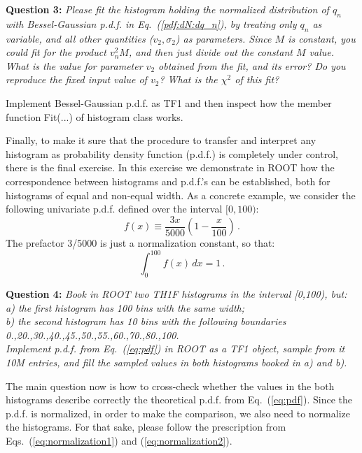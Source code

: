 \documentclass[11pt]{article}
\begin{document}
\bigskip
	
\noindent\textbf{Question 3:} {\it Please fit the histogram holding the normalized distribution of $q_n$ with Bessel-Gaussian p.d.f. in Eq.~(\ref{pdf:dN:dq_n}), by treating only $q_n$ as variable, and all other quantities ($v_2,\sigma_2$) as parameters. Since $M$ is constant, you could fit for the product $v_n^2 M$, and then just divide out the constant $M$ value. What is the value for parameter $v_2$ obtained from the fit, and its error? Do you reproduce the fixed input value of $v_2$? What is the $\chi^2$ of this fit?}

\bigskip
	 
 Implement Bessel-Gaussian p.d.f. as TF1 and then inspect how the member function Fit(...) of histogram class works.

\bigskip
		
\noindent Finally, to make it sure that the procedure to transfer and interpret any histogram as probability density function (p.d.f.) is completely under control, there is the final exercise. In this exercise we demonstrate in ROOT how the correspondence between histograms and p.d.f.'s can be established, both for histograms of equal and non-equal width. As a concrete example, we consider the following univariate p.d.f. defined over the interval $[0,100)$: 
%
\begin{equation}
f(x) \equiv \frac{3x}{5000}\left(1-\frac{x}{100}\right)\,.
\label{eq:pdf}
\end{equation}
%
The prefactor 3/5000 is just a normalization constant, so that:
%
\begin{equation}
\int_0^{100} f(x)\,dx = 1\,.
\end{equation}
% 

\bigskip

\noindent\textbf{Question 4:} {\it Book in ROOT two TH1F histograms in the interval [0,100), but:\\
a) the first histogram has 100 bins with the same width;\\
b) the second histogram has 10 bins with the following boundaries {0.,20.,30.,40.,45.,50.,55.,60.,70.,80.,100.}\\
Implement p.d.f. from Eq.~(\ref{eq:pdf}) in ROOT as a TF1 object, sample from it 10M entries, and fill the sampled values in both histograms booked in a) and b).}

\bigskip

\noindent The main question now is how to cross-check whether the values in the both histograms describe correctly the theoretical p.d.f. from Eq.~(\ref{eq:pdf}). Since the p.d.f. is normalized, in order to make the comparison, we also need to normalize the histograms. For that sake, please follow the prescription from Eqs.~(\ref{eq:normalization1}) and (\ref{eq:normalization2}).
\end{document}
